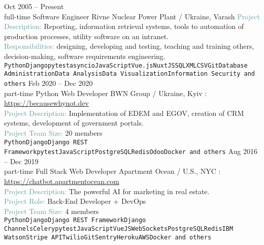 \documentclass[9pt]{developercv} %
\begin{document}
\begin{entrylist}
	\entry
        {Oct 2005 -- Present\\\footnotesize{full-time}}
		{Software Engineer}
        {Rivne Nuclear Power Plant / Ukraine, Varash}
        {\textcolor{CadetBlue}{Project Description:} Reporting, information retrieval systems, tools to automation of production processes, utility software on an intranet.\\\textcolor{CadetBlue}{Responsibilities:} designing, developing and testing, teaching and training others, decision-making, software requirements engineering.\\
        \texttt{Python}\slashsep\texttt{Django}\slashsep\texttt{pytest}\slashsep\texttt{asyncio}\slashsep\texttt{JavaScript}\slashsep\texttt{Vue.js}\slashsep\texttt{NuxtJS}\slashsep\texttt{SQL}\slashsep\texttt{XML}\slashsep\texttt{CSV}\slashsep\texttt{Git}\slashsep\texttt{Database Administration}\slashsep\texttt{Data Analysis}\slashsep\texttt{Data Visualization}\slashsep\texttt{Information Security and others}}
	\entry
		{Feb 2020 -- Dec 2020\\\footnotesize{part-time}}
		{Python Web Developer}
        {BWN Group / Ukraine, Kyiv}
        {\faLink{}: {\href{https://becausewhynot.dev}{https://becausewhynot.dev}}\\\textcolor{CadetBlue}{Project Description:} Implementation of EDEM and EGOV, creation of CRM systems, development of government portals. \\\textcolor{CadetBlue}{Project Team Size:} 20 members\\ \texttt{Python}\slashsep\texttt{Django}\slashsep\texttt{Django REST Framework}\slashsep\texttt{pytest}\slashsep\texttt{JavaScript}\slashsep\texttt{PostgreSQL}\slashsep\texttt{Redis}\slashsep\texttt{Odoo}\slashsep\texttt{Docker and others}}
	\entry
		{Aug 2016 -- Dec 2019\\\footnotesize{part-time}}
		{Full Stack Web Developer}
        {Apartment Ocean / U.S., NYC}
        {\faLink{}: {\href{https://chatbot.apartmentocean.com}{https://chatbot.apartmentocean.com}}\\\textcolor{CadetBlue}{Project Description:} The powerful AI for marketing in real estate.\\\textcolor{CadetBlue}{Project Role:} Back-End Developer + DevOps\\ \textcolor{CadetBlue}{Project Team Size:} 4 members\\ \texttt{Python}\slashsep\texttt{Django}\slashsep\texttt{Django REST Framework}\slashsep\texttt{Django
        Channels}\slashsep\texttt{Celery}\slashsep\texttt{pytest}\slashsep\texttt{JavaScript}\slashsep\texttt{VueJS}\slashsep\texttt{WebSockets}\slashsep\texttt{PostgreSQL}\slashsep\texttt{Redis}\slashsep\texttt{IBM Watson}\slashsep\texttt{Stripe
API}\slashsep\texttt{Twilio}\slashsep\texttt{Git}\slashsep\texttt{Sentry}\slashsep\texttt{Heroku}\slashsep\texttt{AWS}\slashsep\texttt{Docker and others}}
\end{entrylist}
\end{document}
